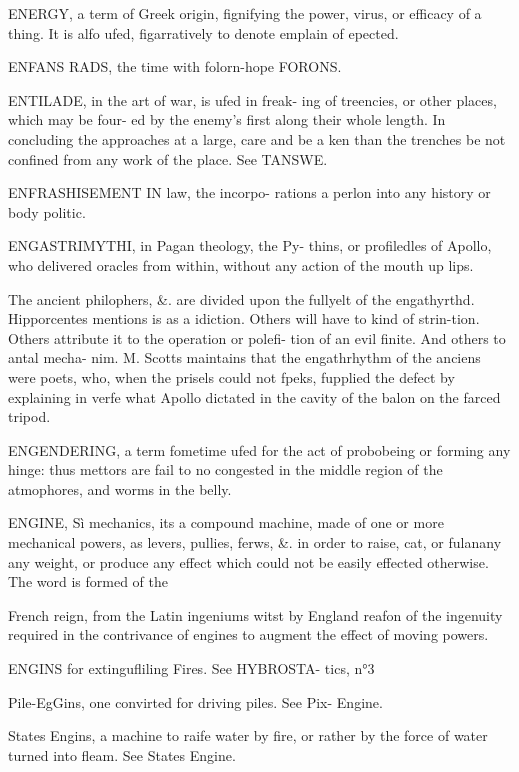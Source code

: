 ENERGY, a term of Greek origin, fignifying the power, virus, or efficacy of a thing. It is alfo ufed, figarratively to denote emplain of epected.\par\medskip
ENFANS RADS, the time with folorn-hope FORONS.\par\medskip
ENTILADE, in the art of war, is ufed in freak- ing of treencies, or other places, which may be four- ed by the enemy’s first along their whole length. In concluding the approaches at a large, care and be a ken than the trenches be not confined from any work of the place. See TANSWE.\par\medskip
ENFRASHISEMENT IN law, the incorpo- rations a perlon into any history or body politic.\par\medskip
ENGASTRIMYTHI, in Pagan theology, the Py- thins, or profiledles of Apollo, who delivered oracles from within, without any action of the mouth up lips.\par\medskip
The ancient philophers, \&. are divided upon the fullyelt of the engathyrthd. Hipporcentes mentions is as a idiction. Others will have to kind of strin-tion. Others attribute it to the operation or polefi- tion of an evil finite. And others to antal mecha- nim. M. Scotts maintains that the engathrhythm of the anciens were poets, who, when the prisels could not fpeks, fupplied the defect by explaining in verfe what Apollo dictated in the cavity of the balon on the farced tripod.\par\medskip
ENGENDERING, a term fometime ufed for the act of probobeing or forming any hinge: thus mettors are fail to no congested in the middle region of the atmophores, and worms in the belly.\par\medskip
ENGINE, Sì mechanics, its a compound machine, made of one or more mechanical powers, as levers, pullies, ferws, \&. in order to raise, cat, or fulanany any weight, or produce any effect which could not be easily effected otherwise. The word is formed of the\par\medskip
French reign, from the Latin ingeniums witst by England reafon of the ingenuity required in the contrivance of engines to augment the effect of moving powers.\par\medskip
ENGINS for extingufliling Fires. See HYBROSTA- tics, n°3\par\medskip
Pile-EgGins, one convirted for driving piles. See Pix- Engine.\par\medskip
States Engins, a machine to raife water by fire, or rather by the force of water turned into fleam. See States Engine.\par\medskip
